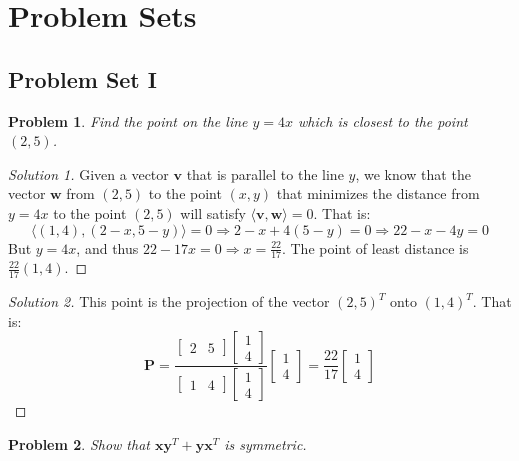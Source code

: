 \documentclass{article}
\theoremstyle{mystyle}
\newtheorem{problem}{Problem}[section]
\begin{document}
\section{Problem Sets}
\subsection{Problem Set I}
\begin{problem}
Find the point on the line $y=4x$ which is closest to the point $(2,5)$.
\end{problem}
\begin{proof}[Solution 1]
Given a vector $\mathbf{v}$ that is parallel to the line $y$, we know that the vector $\mathbf{w}$ from $(2,5)$ to the point $(x,y)$ that minimizes the distance from $y=4x$ to the point $(2,5)$ will satisfy $\langle \mathbf{v}, \mathbf{w}\rangle = 0$. That is:
\begin{equation*}
    \big\langle (1,4), (2-x,5-y)\big\rangle = 0\Rightarrow 2-x+4(5-y) = 0 \Rightarrow 22 - x - 4 y = 0    
\end{equation*}
But $y = 4x$, and thus $22-17x = 0 \Rightarrow x= \frac{22}{17}$. The point of least distance is $\frac{22}{17}(1,4)$.
\end{proof}
\begin{proof}[Solution 2]
This point is the projection of the vector $(2,5)^T$ onto $(1,4)^T$. That is:
\begin{equation*}
    \mathbf{P} = \frac{\begin{bmatrix}2 & 5 \end{bmatrix} \begin{bmatrix} 1 \\ 4 \end{bmatrix}}{\begin{bmatrix} 1 & 4 \end{bmatrix} \begin{bmatrix} 1 \\ 4 \end{bmatrix}} \begin{bmatrix} 1 \\ 4 \end{bmatrix} = \frac{22}{17} \begin{bmatrix} 1 \\ 4\end{bmatrix}
\end{equation*}
\end{proof}
\begin{problem}
Show that $\mathbf{x}\mathbf{y}^T + \mathbf{y}\mathbf{x}^T$ is symmetric.
\end{problem}
\end{document}
